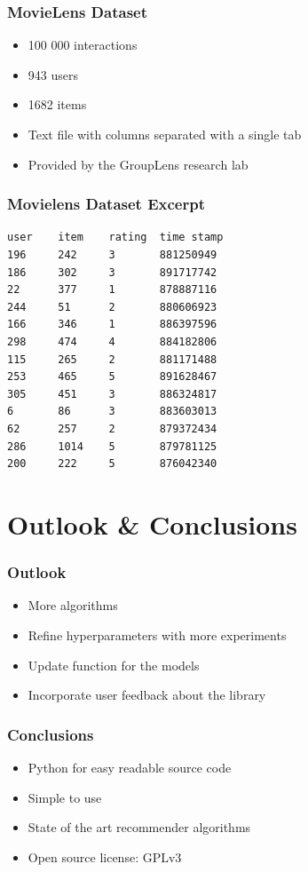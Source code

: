 \documentclass[mathserif,svgnames]{beamer}
\begin{document}
\begin{frame}
    \frametitle{MovieLens Dataset}
    \begin{itemize}
        \item 100 000 interactions
        \item 943 users
        \item 1682 items
        \item Text file with columns separated with a single tab
        \item Provided by the GroupLens research lab
    \end{itemize}
\end{frame}
\begin{frame}[fragile]
    \frametitle{Movielens Dataset Excerpt}
\begin{lstlisting}
user    item    rating  time stamp
196     242     3       881250949
186     302     3       891717742
22      377     1       878887116
244     51      2       880606923
166     346     1       886397596
298     474     4       884182806
115     265     2       881171488
253     465     5       891628467
305     451     3       886324817
6       86      3       883603013
62      257     2       879372434
286     1014    5       879781125
200     222     5       876042340
\end{lstlisting}
\end{frame}

\section{Outlook \& Conclusions}
\begin{frame}
\frametitle{Outlook}\pause
\begin{itemize}
	\item More algorithms\pause
	\item Refine hyperparameters with more experiments\pause
	\item Update function for the models\pause
	\item Incorporate user feedback about the library
\end{itemize}
\end{frame}

\begin{frame} 
\frametitle{Conclusions} 
\begin{itemize}
    \item Python for easy readable source code \visible<2->{$\checkmark$}
    \item Simple to use 
    \item State of the art recommender algorithms \visible<4->{$\checkmark$}
    \item Open source license: GPLv3 
\end{itemize}
\end{frame}
\end{document}
